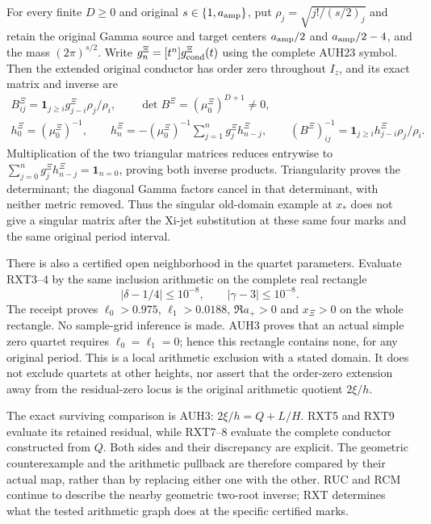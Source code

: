 \documentclass[11pt]{article}
\begin{document}
For every finite $D\ge0$ and original $s\in\{1,a_{\rm amp}\}$,
put $\rho_j=\sqrt{j!/(s/2)_j}$ and retain the original Gamma
source and target centers $a_{\rm amp}/2$ and
$a_{\rm amp}/2-4$, and the mass $(2\pi)^{s/2}$.
Write $g_n^\Xi=[t^n]g_{\rm cond}^\Xi(t)$ using the complete
AUH23 symbol. Then the extended original conductor has order zero
throughout $I_z$, and its exact matrix and inverse are
\[
\begin{gathered}
 B_{ij}^\Xi=\boldsymbol1_{j\ge i}g_{j-i}^\Xi\rho_j/\rho_i,
 \qquad \det B^\Xi=(\mu_0^\Xi)^{D+1}\ne0,\\
 h_0^\Xi=(\mu_0^\Xi)^{-1},\qquad
 h_n^\Xi=-(\mu_0^\Xi)^{-1}\sum_{j=1}^n g_j^\Xi h_{n-j}^\Xi,
 \qquad (B^\Xi)^{-1}_{ij}
 =\boldsymbol1_{j\ge i}h_{j-i}^\Xi\rho_j/\rho_i.
\end{gathered}\tag{RXT8}
\]
Multiplication of the two triangular matrices reduces entrywise
to $\sum_{j=0}^ng_j^\Xi h_{n-j}^\Xi=\boldsymbol1_{n=0}$,
proving both inverse products. Triangularity proves the determinant;
the diagonal Gamma factors cancel in that determinant, with neither
metric removed. Thus the singular old-domain example at $x_*$
does not give a singular matrix after the Xi-jet substitution at
these same four marks and the same original period interval.

There is also a certified open neighborhood in the quartet
parameters. Evaluate RXT3--4 by the same inclusion arithmetic on
the complete real rectangle
\[
 |\delta-1/4|\le10^{-8},\qquad|\gamma-3|\le10^{-8}.
 \tag{RXT9}
\]
The receipt proves $\ell_0>0.975$, $\ell_1>0.0188$,
$\Re a_+>0$ and $x_\Xi>0$ on the whole rectangle.
No sample-grid inference is made. AUH3 proves that an actual
simple zero quartet requires $\ell_0=\ell_1=0$; hence this
rectangle contains none, for any original period. This is a
local arithmetic exclusion with a stated domain. It does not
exclude quartets at other heights, nor assert that the order-zero
extension away from the residual-zero locus is the original
arithmetic quotient $2\xi/h$.

The exact surviving comparison is AUH3:
$2\xi/h=Q+L/H$. RXT5 and RXT9 evaluate its retained residual,
while RXT7--8 evaluate the complete conductor constructed from
$Q$. Both sides and their discrepancy are explicit. The geometric
counterexample and the arithmetic pullback are therefore compared
by their actual map, rather than by replacing either one with the
other. RUC and RCM continue to describe the nearby geometric
two-root inverse; RXT determines what the tested arithmetic graph
does at the specific certified marks.
\end{document}
